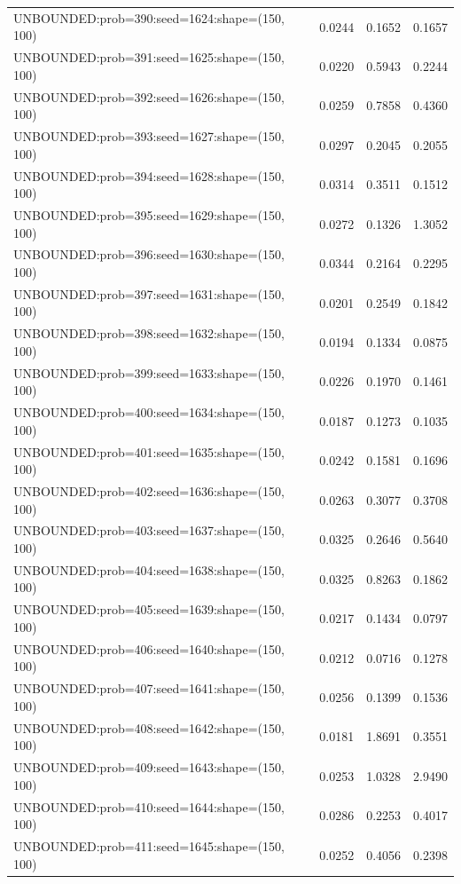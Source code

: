 \begin{longtable}{lccc}
UNBOUNDED:prob=390:seed=1624:shape=(150, 100) &   0.0244 &  0.1652 &  0.1657 \\
UNBOUNDED:prob=391:seed=1625:shape=(150, 100) &   0.0220 &  0.5943 &  0.2244 \\
UNBOUNDED:prob=392:seed=1626:shape=(150, 100) &   0.0259 &  0.7858 &  0.4360 \\
UNBOUNDED:prob=393:seed=1627:shape=(150, 100) &   0.0297 &  0.2045 &  0.2055 \\
UNBOUNDED:prob=394:seed=1628:shape=(150, 100) &   0.0314 &  0.3511 &  0.1512 \\
UNBOUNDED:prob=395:seed=1629:shape=(150, 100) &   0.0272 &  0.1326 &  1.3052 \\
UNBOUNDED:prob=396:seed=1630:shape=(150, 100) &   0.0344 &  0.2164 &  0.2295 \\
UNBOUNDED:prob=397:seed=1631:shape=(150, 100) &   0.0201 &  0.2549 &  0.1842 \\
UNBOUNDED:prob=398:seed=1632:shape=(150, 100) &   0.0194 &  0.1334 &  0.0875 \\
UNBOUNDED:prob=399:seed=1633:shape=(150, 100) &   0.0226 &  0.1970 &  0.1461 \\
UNBOUNDED:prob=400:seed=1634:shape=(150, 100) &   0.0187 &  0.1273 &  0.1035 \\
UNBOUNDED:prob=401:seed=1635:shape=(150, 100) &   0.0242 &  0.1581 &  0.1696 \\
UNBOUNDED:prob=402:seed=1636:shape=(150, 100) &   0.0263 &  0.3077 &  0.3708 \\
UNBOUNDED:prob=403:seed=1637:shape=(150, 100) &   0.0325 &  0.2646 &  0.5640 \\
UNBOUNDED:prob=404:seed=1638:shape=(150, 100) &   0.0325 &  0.8263 &  0.1862 \\
UNBOUNDED:prob=405:seed=1639:shape=(150, 100) &   0.0217 &  0.1434 &  0.0797 \\
UNBOUNDED:prob=406:seed=1640:shape=(150, 100) &   0.0212 &  0.0716 &  0.1278 \\
UNBOUNDED:prob=407:seed=1641:shape=(150, 100) &   0.0256 &  0.1399 &  0.1536 \\
UNBOUNDED:prob=408:seed=1642:shape=(150, 100) &   0.0181 &  1.8691 &  0.3551 \\
UNBOUNDED:prob=409:seed=1643:shape=(150, 100) &   0.0253 &  1.0328 &  2.9490 \\
UNBOUNDED:prob=410:seed=1644:shape=(150, 100) &   0.0286 &  0.2253 &  0.4017 \\
UNBOUNDED:prob=411:seed=1645:shape=(150, 100) &   0.0252 &  0.4056 &  0.2398 \\

\end{longtable}
